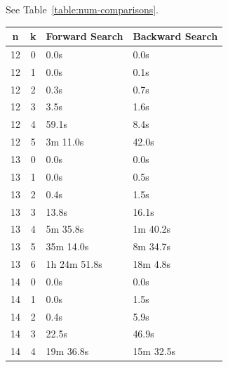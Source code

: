 \documentclass[10pt,journal,compsoc]{IEEEtran}
\begin{document}
See Table~\ref{table:num-comparisons}.


\begin{table}[htbp]
  \begin{tabular}{c|c|l|l}
    \textbf{n} & \textbf{k} & \textbf{Forward Search } & \textbf{Backward Search } \\ \hline
    12         & 0          & 0.0s                     & 0.0s                      \\
    12         & 1          & 0.0s                     & 0.1s                      \\
    12         & 2          & 0.3s                     & 0.7s                      \\
    12         & 3          & 3.5s                     & 1.6s                      \\
    12         & 4          & 59.1s                    & 8.4s                      \\
    12         & 5          & 3m 11.0s                 & 42.0s                     \\
    \hline
    13         & 0          & 0.0s                     & 0.0s                      \\
    13         & 1          & 0.0s                     & 0.5s                      \\
    13         & 2          & 0.4s                     & 1.5s                      \\
    13         & 3          & 13.8s                    & 16.1s                     \\
    13         & 4          & 5m 35.8s                 & 1m 40.2s                  \\
    13         & 5          & 35m 14.0s                & 8m 34.7s                  \\
    13         & 6          & 1h 24m 51.8s             & 18m 4.8s                  \\
    \hline
    14         & 0          & 0.0s                     & 0.0s                      \\
    14         & 1          & 0.0s                     & 1.5s                      \\
    14         & 2          & 0.4s                     & 5.9s                      \\
    14         & 3          & 22.5s                    & 46.9s                     \\
    14         & 4          & 19m 36.8s                & 15m 32.5s                 \\

\end{tabular}
\end{table}
\end{document}
